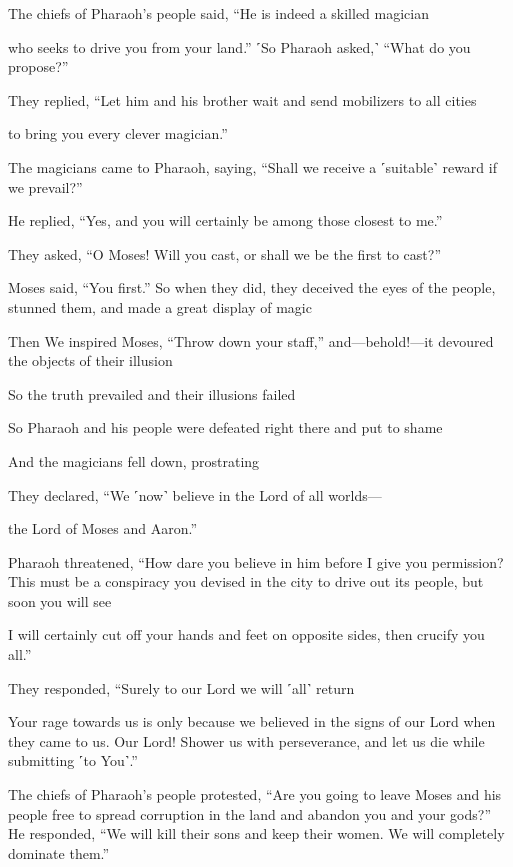 The chiefs of Pharaoh’s people said, “He is indeed a skilled magician

who seeks to drive you from your land.” ˹So Pharaoh asked,˺ “What do you propose?”

They replied, “Let him and his brother wait and send mobilizers to all cities

to bring you every clever magician.”

The magicians came to Pharaoh, saying, “Shall we receive a ˹suitable˺ reward if we prevail?”

He replied, “Yes, and you will certainly be among those closest to me.”

They asked, “O Moses! Will you cast, or shall we be the first to cast?”

Moses said, “You first.” So when they did, they deceived the eyes of the people, stunned them, and made a great display of magic

Then We inspired Moses, “Throw down your staff,” and—behold!—it devoured the objects of their illusion

So the truth prevailed and their illusions failed

So Pharaoh and his people were defeated right there and put to shame

And the magicians fell down, prostrating

They declared, “We ˹now˺ believe in the Lord of all worlds—

the Lord of Moses and Aaron.”

Pharaoh threatened, “How dare you believe in him before I give you permission? This must be a conspiracy you devised in the city to drive out its people, but soon you will see

I will certainly cut off your hands and feet on opposite sides, then crucify you all.”

They responded, “Surely to our Lord we will ˹all˺ return

Your rage towards us is only because we believed in the signs of our Lord when they came to us. Our Lord! Shower us with perseverance, and let us die while submitting ˹to You˺.”

The chiefs of Pharaoh’s people protested, “Are you going to leave Moses and his people free to spread corruption in the land and abandon you and your gods?” He responded, “We will kill their sons and keep their women. We will completely dominate them.”

